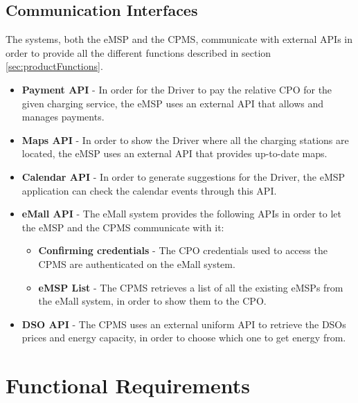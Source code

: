 \subsection{Communication Interfaces}
\label{subsec:communicationInterfaces}
The systems, both the eMSP and the CPMS, communicate with external APIs in order to provide all the different functions described in section \ref{sec:productFunctions}.
\begin{itemize}
    \item \textbf{Payment API} - In order for the Driver to pay the relative CPO for the given charging service, the eMSP uses an external API that allows and manages payments.
    \item \textbf{Maps API} - In order to show the Driver where all the charging stations are located, the eMSP uses an external API that provides up-to-date maps.
    \item \textbf{Calendar API} - In order to generate suggestions for the Driver, the eMSP application can check the calendar events through this API.
    \item \textbf{eMall API} - The eMall system provides the following APIs in order to let the eMSP and the CPMS communicate with it:
        \begin{itemize}
            \item \textbf{Confirming credentials} - The CPO credentials used to access the CPMS are authenticated on the eMall system.
            \item \textbf{eMSP List} - The CPMS retrieves a list of all the existing eMSPs from the eMall system, in order to show them to the CPO.
        \end{itemize}
   \item \textbf{DSO API} - The CPMS uses an external uniform API to retrieve the DSOs prices and energy capacity, in order to choose which one to get energy from. 
\end{itemize}
\label{subsec:sequenceDiagrams}
\section{Functional Requirements}
\label{sec:functionalRequirements}
